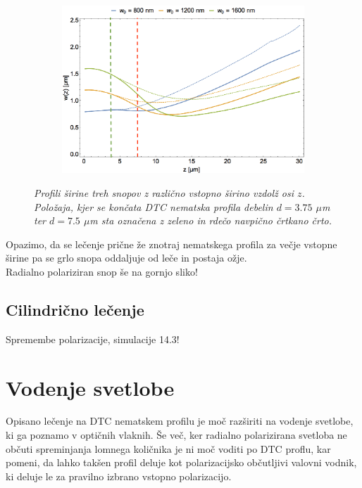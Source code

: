 \documentclass[longbibliography,slovene,a4paper,12pt]{book}
\begin{document}
\begin{figure}[h!]
	\centering
	\begin{subfigure}[b]{0.6\textwidth}
	\includegraphics[width=\textwidth]{slike/width_profiles_2.png}
	\end{subfigure}
	\label{fig:widthprofiles1}
	\caption{\emph{Profili širine treh snopov z različno vstopno širino vzdolž osi $z$. Položaja, kjer se končata DTC nematska profila debelin $d = 3.75$ $\mu$m ter $d = 7.5$ $\mu$m sta označena z zeleno in rdečo navpično črtkano črto.}}
\end{figure}
Opazimo, da se lečenje prične že znotraj nematskega profila za večje vstopne širine pa se grlo snopa oddaljuje od leče in postaja ožje.\\

Radialno polariziran snop še na gornjo sliko!\\

\subsection{Cilindrično lečenje}

Spremembe polarizacije, simulacije 14.3!

\section{Vodenje svetlobe}

Opisano lečenje na DTC nematskem profilu je moč razširiti na vodenje svetlobe, ki ga poznamo v optičnih vlaknih. Še več, ker radialno polarizirana svetloba ne občuti spreminjanja lomnega količnika je ni moč voditi po DTC proflu, kar pomeni, da lahko takšen profil deluje kot polarizacijsko občutljivi valovni vodnik, ki deluje le za pravilno izbrano vstopno polarizacijo.
\end{document}
